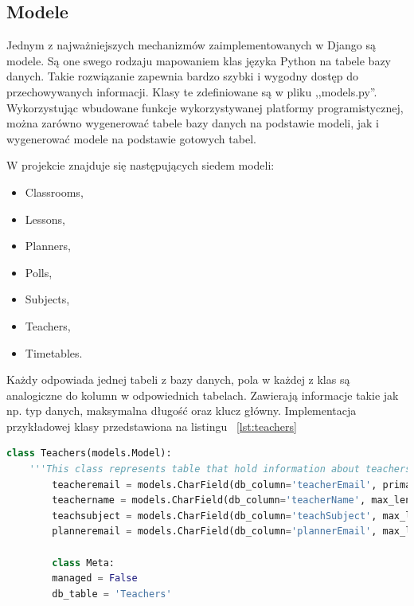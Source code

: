 \subsection{Modele}
Jednym z najważniejszych mechanizmów zaimplementowanych w Django są modele. Są one swego rodzaju mapowaniem klas języka Python na tabele bazy danych. Takie rozwiązanie zapewnia bardzo szybki i wygodny dostęp do przechowywanych informacji. Klasy te zdefiniowane są w pliku ,,models.py''. Wykorzystując wbudowane funkcje wykorzystywanej platformy programistycznej, można zarówno wygenerować tabele bazy danych na podstawie modeli, jak i wygenerować modele na podstawie gotowych tabel.

W projekcie znajduje się następujących siedem modeli: 
\begin{itemize}
	\item Classrooms,
	\item Lessons,
	\item Planners,
	\item Polls,
	\item Subjects,
	\item Teachers,
	\item Timetables.
\end{itemize}
Każdy odpowiada jednej tabeli z bazy danych, pola w każdej z klas są analogiczne do kolumn w odpowiednich tabelach. Zawierają informacje takie jak np. typ danych, maksymalna długość oraz klucz główny.
Implementacja przykładowej klasy przedstawiona na listingu ~\ref{lst:teachers}

\begin{lstlisting}[language=Python, caption=Implementacja klasy Teachers, label={lst:teachers}]
	class Teachers(models.Model):
	'''This class represents table that hold information about teachers '''
		teacheremail = models.CharField(db_column='teacherEmail', primary_key=True, max_length=255)
		teachername = models.CharField(db_column='teacherName', max_length=255)
		teachsubject = models.CharField(db_column='teachSubject', max_length=255)
		planneremail = models.CharField(db_column='plannerEmail', max_length=255)
	
		class Meta:
		managed = False
		db_table = 'Teachers'
\end{lstlisting}

